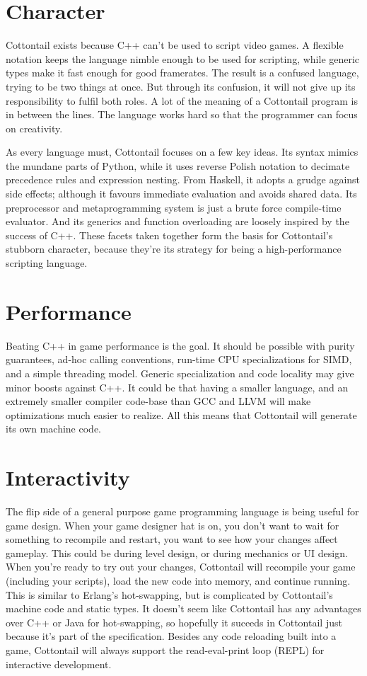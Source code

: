 \section{Character}

Cottontail exists because C++ can't be used to script video games. A
flexible notation keeps the language nimble enough to be used for
scripting, while generic types make it fast enough for good
framerates. The result is a confused language, trying to be two things
at once. But through its confusion, it will not give up its
responsibility to fulfil both roles. A lot of the meaning of a
Cottontail program is in between the lines. The language works hard so
that the programmer can focus on creativity.

As every language must, Cottontail focuses on a few key ideas. Its
syntax mimics the mundane parts of Python, while it uses reverse
Polish notation to decimate precedence rules and expression nesting.
From Haskell, it adopts a grudge against side effects; although it
favours immediate evaluation and avoids shared data. Its preprocessor
and metaprogramming system is just a brute force compile-time
evaluator. And its generics and function overloading are loosely
inspired by the success of C++. These facets taken together form the
basis for Cottontail's stubborn character, because they're its
strategy for being a high-performance scripting language.


\section{Performance}

Beating C++ in game performance is the goal. It should be possible
with purity guarantees, ad-hoc calling conventions, run-time CPU
specializations for SIMD, and a simple threading model. Generic
specialization and code locality may give minor boosts against C++. It
could be that having a smaller language, and an extremely smaller
compiler code-base than GCC and LLVM will make optimizations much
easier to realize. All this means that Cottontail will generate its
own machine code.


\section{Interactivity}

The flip side of a general purpose game programming language is being
useful for game design. When your game designer hat is on, you don't
want to wait for something to recompile and restart, you want to see
how your changes affect gameplay. This could be during level design,
or during mechanics or UI design. When you're ready to try out your
changes, Cottontail will recompile your game (including your scripts),
load the new code into memory, and continue running. This is similar
to Erlang's hot-swapping, but is complicated by Cottontail's machine
code and static types. It doesn't seem like Cottontail has any
advantages over C++ or Java for hot-swapping, so hopefully it suceeds
in Cottontail just because it's part of the specification. Besides any
code reloading built into a game, Cottontail will always support the
read-eval-print loop (REPL) for interactive development.

